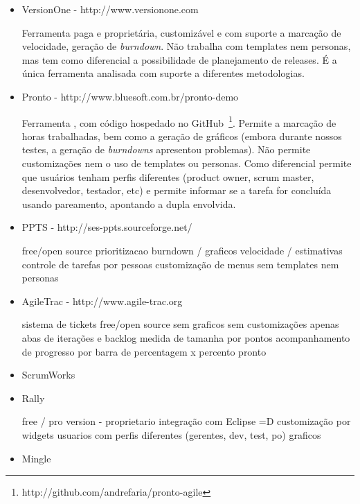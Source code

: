 \begin{itemize}
\item{VersionOne - http://www.versionone.com

Ferramenta paga  e proprietária, customizável e com suporte a marcação de velocidade, geração de \textit{burndown}. Não trabalha
com templates nem personas, mas tem como diferencial a possibilidade de planejamento de releases. É a única ferramenta analisada
com suporte a diferentes metodologias.}

\item{Pronto - http://www.bluesoft.com.br/pronto-demo

Ferramenta \opensource, com código hospedado no GitHub~\footnote{http://github.com/andrefaria/pronto-agile}.
Permite a marcação de horas trabalhadas, bem como a geração de gráficos (embora durante nossos testes, a geração de \textit{burndowns} apresentou problemas). Não permite customizações nem o uso de templates ou personas. Como
diferencial permite que usuários tenham perfis diferentes (product owner, scrum master, desenvolvedor, testador, etc) e
permite informar se a tarefa for concluída usando pareamento, apontando a dupla envolvida.}

\item{PPTS - http://ses-ppts.sourceforge.net/

free/open source
prioritizacao
burndown / graficos
velocidade / estimativas
controle de tarefas por pessoas
customização de menus
sem templates nem personas}

\item{AgileTrac - http://www.agile-trac.org

sistema de tickets
free/open source
sem graficos
sem customizações
apenas abas de iterações e backlog
medida de tamanha por pontos
acompanhamento de progresso por barra de percentagem x percento pronto}

\item{ScrumWorks}

\item{Rally

free / pro version - proprietario
integração com Eclipse =D
customização por widgets
usuarios com perfis diferentes (gerentes, dev, test, po)
graficos}

\item Mingle

\end{itemize}

